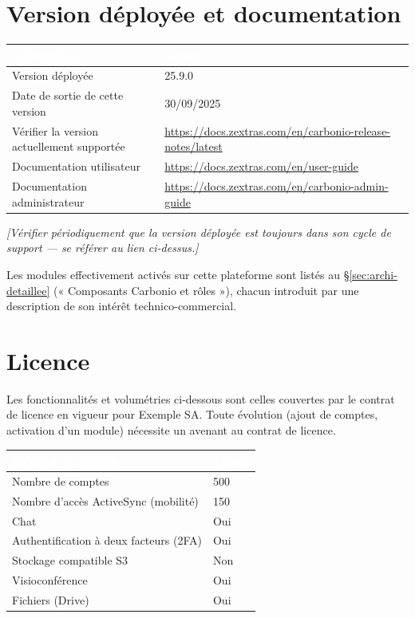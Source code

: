 \documentclass[11pt,a4paper]{report}
\newcommand{\placeholder}[1]{\textit{\textcolor{placeholdercol}{[#1]}}\par\vspace{4pt}}
\newcommand{\tblhead}[1]{\textcolor{white}{\textbf{#1}}}
\begin{document}
\section{Version déployée et documentation}
\begin{longtable}{|p{4.5cm}|p{8.5cm}|}
\hline
\rowcolor{primary}\tblhead{Information} & \tblhead{Valeur} \\
\hline
\endhead
Version déployée & 25.\allowbreak{}9.\allowbreak{}0 \\
\hline
Date de sortie de cette version & 30/09/2025 \\
\hline
Vérifier la version actuellement supportée & \url{https://docs.zextras.com/en/carbonio-release-notes/latest } \\
\hline
Documentation utilisateur & \url{https://docs.zextras.com/en/user-guide } \\
\hline
Documentation administrateur & \url{https://docs.zextras.com/en/carbonio-admin-guide } \\
\hline
\end{longtable}
\placeholder{Vérifier périodiquement que la version déployée est toujours dans son cycle de support --- se référer au lien ci-dessus.}

Les modules effectivement activés sur cette plateforme sont listés au \S\ref{sec:archi-detaillee} (« Composants Carbonio et rôles »), chacun introduit par une description de son intérêt technico-commercial.

\section{Licence}
Les fonctionnalités et volumétries ci-dessous sont celles couvertes par le contrat de licence en vigueur pour Exemple SA. Toute évolution (ajout de comptes, activation d'un module) nécessite un avenant au contrat de licence.
\begin{longtable}{|p{7cm}|p{6cm}|}
\hline
\rowcolor{primary}\tblhead{Élément de licence} & \tblhead{Valeur} \\
\hline
\endhead
Nombre de comptes & 500 \\
\hline
Nombre d'accès ActiveSync (mobilité) & 150 \\
\hline
Chat & Oui \\
\hline
Authentification à deux facteurs (2FA) & Oui \\
\hline
Stockage compatible S3 & Non \\
\hline
Visioconférence & Oui \\
\hline
Fichiers (Drive) & Oui \\
\hline
\end{longtable}
\end{document}

